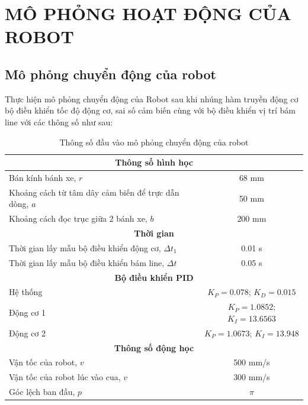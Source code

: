 \chapter{MÔ PHỎNG HOẠT ĐỘNG CỦA ROBOT}
     \section{Mô phỏng chuyển động của robot}
          \hspace*{0.6cm}Thực hiện mô phỏng chuyển động của Robot sau khi nhúng hàm truyền động cơ
          bộ điều khiển tốc độ động cơ, sai số cảm biến cùng với bộ điều khiển vị trí bám line  với các thông số như sau:
          \begin{table}[h]
               \centering
               \begin{tabular}{|l|c|}
               \hline
               \multicolumn{2}{|c|}{\textbf{Thông số hình học}} \\
               \hline
               Bán kính bánh xe, $r$ & 68 mm \\
               \hline
               Khoảng cách từ tâm dây cảm biến để trực dẫn dòng, $a$ & 50 mm \\
               \hline
               Khoảng cách đọc trục giữa 2 bánh xe, $b$ & 200 mm \\
               \hline
               \multicolumn{2}{|c|}{\textbf{Thời gian}} \\
               \hline
               Thời gian lấy mẫu bộ điều khiển động cơ, $\Delta t_1$ & 0.01 s \\
               \hline
               Thời gian lấy mẫu bộ điều khiển bám line, $\Delta t$ & 0.05 s \\
               \hline
               \multicolumn{2}{|c|}{\textbf{Bộ điều khiển PID}} \\
               \hline
               Hệ thống & $K_P = 0.078$; $K_D = 0.015$ \\
               \hline
               Động cơ 1 & $K_P = 1.0852$; $K_I = 13.6563$ \\
               \hline
               Động cơ 2 & $K_P = 1.0673$; $K_I = 13.948$ \\
               \hline
               \multicolumn{2}{|c|}{\textbf{Thông số động học}} \\
               \hline
               Vận tốc của robot, $v$ & 500 mm/s \\
               \hline
               Vận tốc của robot lúc vào cua, $v$ & 300 mm/s \\
               \hline
               Góc lệch ban đầu, $p$ & $\pi$ \\
               \hline
               \end{tabular}
               \label{tab:robot_specifications}
               \caption{Thông số đầu vào mô phỏng chuyển động của robot}
          \end{table}
